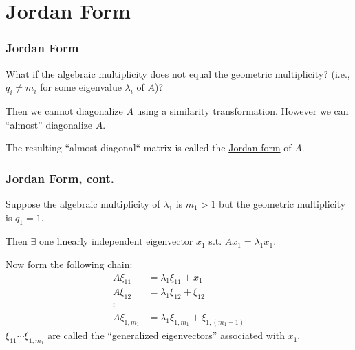 \documentclass{beamer}
\begin{document}
\section{Jordan Form}
\frame{\sectionpage}	

\begin{frame}\frametitle{Jordan Form}
	What if the algebraic multiplicity does not equal the geometric
	multiplicity? (i.e., $q_i \neq m_i$ for some eigenvalue $\lambda_i$ of $A$)?
	
	\vfill
	
	Then we cannot diagonalize $A$ using a similarity transformation.
	However we can ``almost'' diagonalize $A$.
	
	\vfill
	
	The resulting ``almost diagonal`` matrix is called the \underline{Jordan form} of $A$.	
\end{frame}

\begin{frame}\frametitle{Jordan Form, cont.}
	
	Suppose the algebraic multiplicity of $\lambda_1$ is $m_1 > 1$ but the
	geometric multiplicity is $q_1 = 1$.
	
	\vfill
	
	Then $\exists$ one linearly independent eigenvector $x_1$ s.t. $Ax_1 = \lambda_1 x_1$.
	
	\vfill
	
	Now form the following chain:
	\begin{align*}
		A\xi_{11} &= \lambda_1 \xi_{11} + x_1\\
		A\xi_{12} &= \lambda_1 \xi_{12} + \xi_{12}\\
		\vdots\\
		A \xi_{1,m_1} &= \lambda_1 \xi_{1,m_1} + \xi_{1,({m_1}-1)}
	\end{align*}
	$\xi_{11} \cdots \xi_{1,m_1}$ are called the ``generalized eigenvectors'' associated with $x_1$.	
\end{frame}
\end{document}
